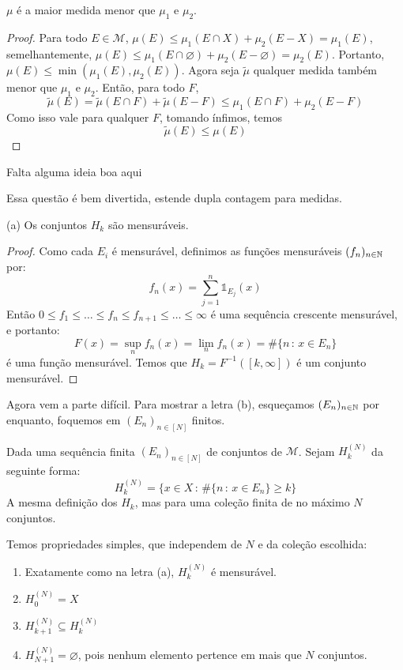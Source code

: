 \begin{prop}
    $\mu$ é a maior medida menor que $\mu_1$ e $\mu_2$.
\end{prop}
\begin{proof}
    Para todo $E \in \mathcal{M}$, $\mu(E) \leq \mu_1(E \cap X) + \mu_2(E - X) = \mu_1(E)$, 
    semelhantemente, $\mu(E) \leq \mu_1(E \cap \varnothing) + \mu_2(E - \varnothing) = \mu_2(E)$. Portanto,
    $\mu(E) \leq \min(\mu_1(E), \mu_2(E))$. Agora seja $\tilde{\mu}$ qualquer medida também menor que $\mu_1$ e $\mu_2$.
    Então, para todo $F$,
    $$\tilde{\mu}(E) = \tilde{\mu}(E\cap F) + \tilde{\mu}(E - F) \leq \mu_1(E \cap F) + \mu_2(E - F)$$
    Como isso vale para qualquer $F$, tomando ínfimos, temos
    $$\tilde{\mu}(E) \leq \mu(E)$$
\end{proof}

\prob
Falta alguma ideia boa aqui


\prob
Essa questão é bem divertida, estende dupla contagem para medidas.

\begin{prop}
    (a) Os conjuntos $H_k$ são mensuráveis.
\end{prop}
\begin{proof}
    Como cada $E_i$ é mensurável, definimos as funções mensuráveis $(f_n)_{n \in \mathbb{N}}$ por:
    $$f_n(x) = \sum_{j = 1}^{n} \mathds{1}_{E_j}(x)$$
    Então $0 \leq f_1 \leq \dots \leq f_n \leq f_{n+1} \leq \dots \leq \infty$ é uma sequência crescente
    mensurável, e portanto: 
    $$F(x) = \sup_n f_n(x) = \lim_n f_n(x) = \#\{n \, : \, x \in E_n \}$$
    é uma função mensurável. Temos que $H_k = F^{-1}([k,\infty])$ é um conjunto mensurável.
\end{proof}

Agora vem a parte difícil. Para mostrar a letra (b), esqueçamos $(E_n)_{n \in \mathbb{N}}$ por enquanto, foquemos
em $(E_n)_{n \in [N]}$ finitos.

\begin{definition}
    Dada uma sequência finita $(E_n)_{n \in [N]}$ de conjuntos de $\mathcal{M}$. Sejam $H_k^{(N)}$ da seguinte forma:
    $$H_k^{(N)} = \{x \in X \, : \, \#\{n \, : \, x \in E_n\} \geq k\}$$
    A mesma definição dos $H_k$, mas para uma coleção finita de no máximo $N$ conjuntos.
\end{definition}

\begin{observation}
    Temos propriedades simples, que independem de $N$ e da coleção escolhida:
    \begin{enumerate}
        \item Exatamente como na letra (a), $H_k^{(N)}$ é mensurável.
        \item $H_0^{(N)} = X$
        \item $H_{k+1}^{(N)} \subseteq H_{k}^{(N)}$
        \item $H_{N+1}^{(N)} = \varnothing$, pois nenhum elemento pertence em mais que $N$ conjuntos.
    \end{enumerate}
\end{observation}

